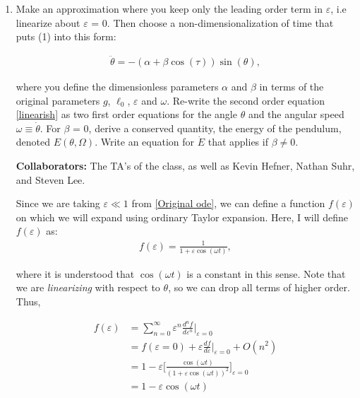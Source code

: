 \documentclass[12pt]{article}
\newcommand{\ep}{\varepsilon}
\begin{document}
\begin{enumerate}[]
    \item Make an approximation where you keep only the leading order term in $\ep$, i.e linearize about $\varepsilon$ = 0. Then choose a non-dimensionalization of time that puts (1) into this form:

    \begin{align}
        \ddot{\theta} = -(\alpha + \beta \cos(\tau))\sin(\theta),   \label{linearish}
    \end{align}

        where you define the dimensionless parameters $\alpha$ and $\beta$ in terms of the original parameters $g$, $\ell_0$, $\varepsilon$ and $\omega$. Re-write the second order equation \ref{linearish} as two first order equations for the angle $\theta$ and the angular speed $\omega \equiv \dot{\theta}$. For $\beta$ = 0, derive a conserved quantity, the energy of the pendulum, denoted $E(\theta, \Omega)$. Write an equation for $\dot{E}$ that applies if $\beta \neq 0$.

        {\color{cit}\vspace{2mm}\noindent\textbf{Collaborators:}} The TA's of the class, as well as Kevin Hefner, Nathan Suhr, and Steven Lee.
        \begin{solution}

        Since we are taking $\ep \ll 1$ from \ref{Original ode}, we can define a function $f(\ep)$ on which we will expand using ordinary Taylor expansion. Here, I will define $f(\ep)$ as:
        \begin{align}
            f(\ep) = \frac{1}{1 + \ep \cos(\omega t)},
        \end{align}

        where it is understood that $\cos(\omega t)$ is a constant in this sense. Note that we are \textit{linearizing} with respect to $\theta$, so we can drop all terms of higher order. Thus, 

        \begin{align}
            f(\ep) &= \sum_{n = 0}^\infty \ep^n\frac{d^nf}{d\ep^n} \Big\rvert_{\ep = 0} \nonumber \\
            &= f(\ep = 0) + \ep\frac{df}{d\ep} \Big\rvert_{\ep = 0} + O(n^2)  \nonumber \\
            &= 1 - \ep \bigg[ \frac{\cos(\omega t)}{(1 + \ep\cos(\omega t))^2} \bigg]_{\ep = 0}  \nonumber \\
            & = 1 - \ep \cos(\omega t) \label{Expansion} 
        \end{align}


\end{solution}
\end{enumerate}
\end{document}
